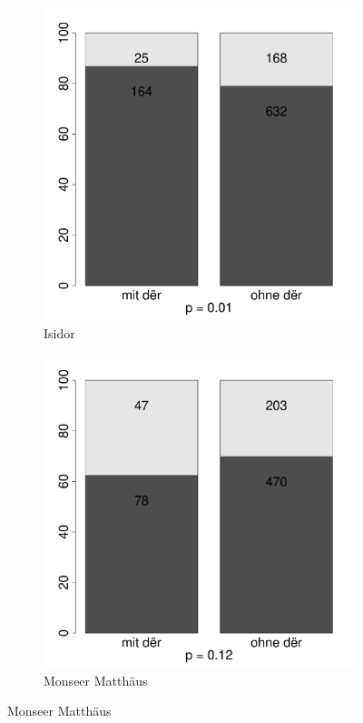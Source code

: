 \begin{figure}
\begin{subfigure}[b]{.5\linewidth}
  \includegraphics[height=.25\textheight]{generated/images/numerus-isidor}
\caption {Isidor}
\end{subfigure}%
\begin{subfigure}[b]{.5\linewidth}
  \includegraphics[height=.25\textheight]{generated/images/numerus-matt}
\caption {Monseer Matthäus}
\end{subfigure}


\end{figure}
